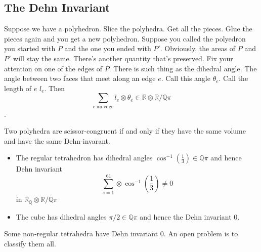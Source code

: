 \documentclass{article}
\newcommand{\Q}{\mathbb{Q}}
\newcommand{\R}{\mathbb{R}}
\begin{document}
\subsection{The Dehn Invariant}
Suppose we have a polyhedron. Slice the polyhedra. Get all the pieces. Glue the pieces again and you get a new polyhedron. Suppose you called the polyedron you started with $P$ and the one you ended with $P'$. Obviously, the areas of $P$ and $P'$ will stay the same. There's another quantity that's preserved. Fix your attention on one of the edges of $P$. There is such thing as the dihedral angle. The angle between two faces that meet along an edge $e$. Call this angle $\theta_e$. Call the length of $e$ $l_e$. Then $$\sum_{e\textrm{ an edge}}l_e\otimes \theta_e\in\R\otimes \R/\Q\pi$$. 
\begin{theorem}
Two polyhedra are scissor-congruent if and only if they have the same volume and have the same Dehn-invarant.
\end{theorem}
\begin{itemize}
    \item The regular tetrahedron has dihedral angles $\cos^{-1}(\frac{1}{3})\in\Q\pi$ and hence Dehn invariant 
    $$\sum_{i=1}^61\otimes\cos^{-1}(\frac{1}{3})\neq 0$$ in $\R_\Q\otimes \R/\Q\pi$
    \item The cube has dihedral angles $\pi/2\in\Q\pi$ and hence the Dehn invariant 0.
\end{itemize}
Some non-regular tetrahedra have Dehn invariant 0. An open problem is to classify them all.
\end{document}
